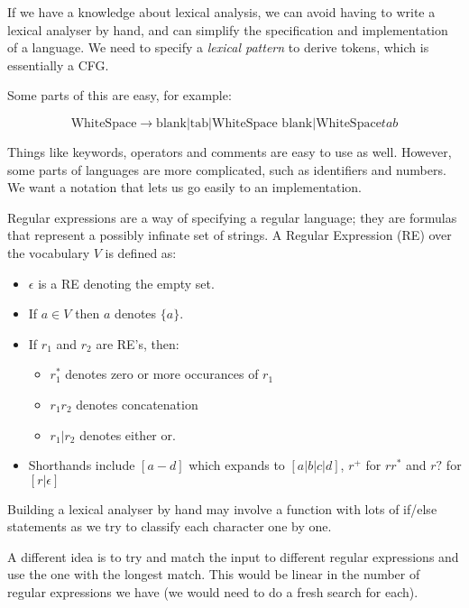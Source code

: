 
If we have a knowledge about lexical analysis, we can avoid having to write a
lexical analyser by hand, and can simplify the specification and implementation
of a language. We need to specify a \textit{lexical pattern} to derive tokens,
which is essentially a CFG.

Some parts of this are easy, for example:

\[
  \text{WhiteSpace} \rightarrow \text{blank} | \text{tab}
    | \text{WhiteSpace blank} | \text{WhiteSpace} tab
\]

Things like keywords, operators and comments are easy to use as well. However,
some parts of languages are more complicated, such as identifiers and numbers.
We want a notation that lets us go easily to an implementation.

Regular expressions are a way of specifying a regular language; they are
formulas that represent a possibly infinate set of strings. A Regular Expression
(RE) over the vocabulary $V$ is defined as:

\begin{itemize}
  \item $\epsilon$ is a RE denoting the empty set.
  \item If $a \in V$ then $a$ denotes $\{a\}$.
  \item If $r_1$ and $r_2$ are RE's, then:
  \begin{itemize}
    \item $r^{*}_1$ denotes zero or more occurances of $r_1$
    \item $r_1r_2$ denotes concatenation
    \item $r_1|r_2$ denotes either or.
  \end{itemize}
  \item Shorthands include $[a-d]$ which expands to $[a|b|c|d]$, $r^+$ for
  $rr^*$ and $r?$ for $[r|\epsilon]$
\end{itemize}


Building a lexical analyser by hand may involve a function with lots of if/else
statements as we try to classify each character one by one.

A different idea is to try and match the input to different regular expressions
and use the one with the longest match. This would be linear in the number of
regular expressions we have (we would need to do a fresh search for each). 

